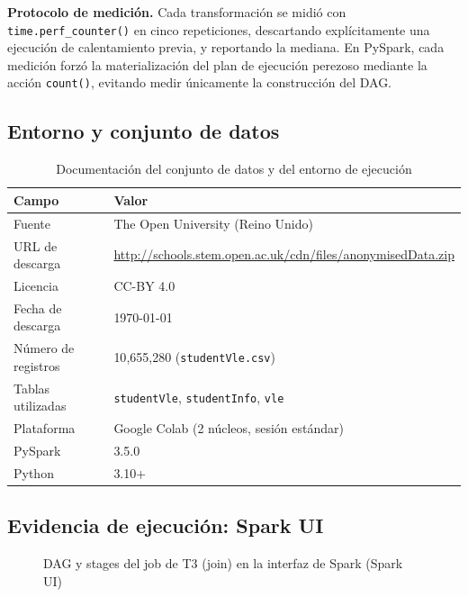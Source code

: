\documentclass[11pt,a4paper]{article}
\begin{document}
\textbf{Protocolo de medición.} Cada transformación se midió con
\texttt{time.perf\_counter()} en cinco repeticiones, descartando
explícitamente una ejecución de calentamiento previa, y reportando la
mediana. En PySpark, cada medición forzó la materialización del plan de
ejecución perezoso mediante la acción \texttt{count()}, evitando medir
únicamente la construcción del DAG.

\subsection{Entorno y conjunto de datos}

\begin{table}[h]
\centering
\begin{tabular}{ll}
\toprule
\textbf{Campo} & \textbf{Valor} \\
\midrule
Fuente & The Open University (Reino Unido) \\
URL de descarga & \url{http://schools.stem.open.ac.uk/cdn/files/anonymisedData.zip} \\
Licencia & CC-BY 4.0 \\
Fecha de descarga & \today \\
Número de registros & 10{,}655{,}280 (\texttt{studentVle.csv}) \\
Tablas utilizadas & \texttt{studentVle}, \texttt{studentInfo}, \texttt{vle} \\
Plataforma & Google Colab (2 núcleos, sesión estándar) \\
PySpark & 3.5.0 \\
Python & 3.10+ \\
\bottomrule
\end{tabular}
\caption{Documentación del conjunto de datos y del entorno de ejecución}
\label{tab:dataset}
\end{table}

\subsection{Evidencia de ejecución: Spark UI}
\begin{figure}[h]
  \centering
  \caption{DAG y stages del job de T3 (join) en la interfaz de Spark (Spark UI)}
  \label{fig:spark_ui}
\end{figure}
\end{document}
